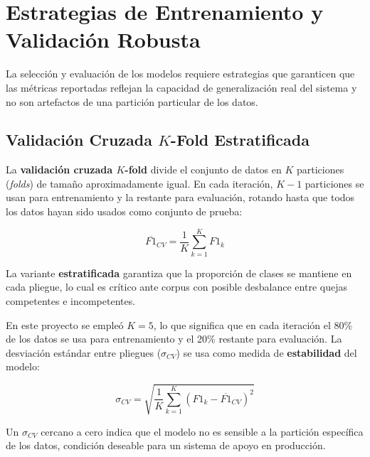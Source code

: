 \section{Estrategias de Entrenamiento y Validación Robusta}

La selección y evaluación de los modelos requiere estrategias que garanticen que
las métricas reportadas reflejan la capacidad de generalización real del sistema
y no son artefactos de una partición particular de los datos.

\subsection{Validación Cruzada $K$-Fold Estratificada}

La \textbf{validación cruzada $K$-fold} divide el conjunto de datos en $K$
particiones (\textit{folds}) de tamaño aproximadamente igual. En cada iteración,
$K-1$ particiones se usan para entrenamiento y la restante para evaluación,
rotando hasta que todos los datos hayan sido usados como conjunto de prueba:

\begin{equation}
  \overline{F1}_{CV}
  = \frac{1}{K} \sum_{k=1}^{K} F1_k
  \label{eq:cv}
\end{equation}

La variante \textbf{estratificada} garantiza que la proporción de clases se
mantiene en cada pliegue, lo cual es crítico ante corpus con posible desbalance
entre quejas competentes e incompetentes.

En este proyecto se empleó $K = 5$, lo que significa que en cada iteración
el 80\% de los datos se usa para entrenamiento y el 20\% restante para
evaluación. La desviación estándar entre pliegues ($\sigma_{CV}$) se usa como
medida de \textbf{estabilidad} del modelo:

\begin{equation}
  \sigma_{CV} = \sqrt{\frac{1}{K} \sum_{k=1}^{K} (F1_k - \overline{F1}_{CV})^2}
  \label{eq:sigma}
\end{equation}

Un $\sigma_{CV}$ cercano a cero indica que el modelo no es sensible a la
partición específica de los datos, condición deseable para un sistema de apoyo
en producción.

